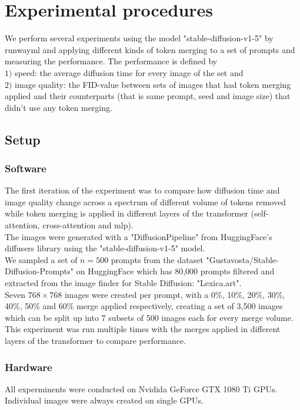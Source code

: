 \section{Experimental procedures}
We perform several experiments using the model "stable-diffusion-v1-5" by runwayml\cite{Rombach_2022_CVPR} and applying different kinds of token merging to a set of prompts and measuring the performance.
The performance is defined by\\ 
\(1)\) speed: the average diffusion time for every image of the set and\\
\(2)\) image quality: the FID-value between sets of images that had token merging applied and their counterparts (that is same prompt, seed and image size) that didn't use any token merging.

\subsection{Setup}
\subsubsection*{Software}
The first iteration of the experiment was to compare how diffusion time and image quality change across a spectrum of different volume of tokens  removed while token merging is applied in different layers of the transformer (self-attention, cross-attention and mlp).\\
The images were generated with a "DiffusionPipeline" from HuggingFace's diffusers library using the "stable-diffusion-v1-5" model\cite{Rombach_2022_CVPR}.\\
We sampled a set of \(n=500\) prompts from the dataset "Gustavosta/Stable-Diffusion-Prompts" on HuggingFace which has 80,000 prompts filtered and extracted from the image finder for Stable Diffusion: "Lexica.art".\\
Seven $768 \times 768$ images were created per prompt, with a 0\%, 10\%, 20\%, 30\%, 40\%, 50\% and 60\% merge applied respectively, creating a set of 3,500 images which can be split up into 7 subsets of 500 images each for every merge volume.\\
This experiment was run multiple times with the merges applied in different layers of the transformer to compare performance.

\subsubsection*{Hardware}
All experminents were conducted on Nvidida GeForce GTX 1080 Ti GPUs. Individual images were always created on single GPUs.


